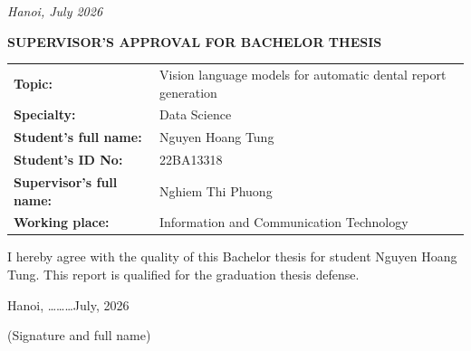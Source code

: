\documentclass[a4paper,12pt]{report}
\begin{document}
\vfill

\begin{center}
    \textit{Hanoi, July 2026}
\end{center}
\newpage
\newpage
{}
\setcounter{page}{1}


\newpage
\thispagestyle{empty}

\begin{center}
    \textbf{\large SUPERVISOR'S APPROVAL FOR BACHELOR THESIS}
\end{center}

\vspace{1.8cm}

\noindent
\renewcommand{\arraystretch}{1.6}
\begin{tabularx}{\textwidth}{@{}>{\bfseries}p{5.2cm}X@{}}
Topic: & Vision language models for automatic dental report generation \\
Specialty: & Data Science \\
Student's full name: & Nguyen Hoang Tung \\
Student's ID No: & 22BA13318 \\
Supervisor's full name: & Nghiem Thi Phuong \\
Working place: & Information and Communication Technology \\
\end{tabularx}

\vspace{1cm}

\noindent
I hereby agree with the quality of this Bachelor thesis for student Nguyen Hoang Tung. This report is qualified for the graduation thesis defense.

\vspace{1cm}

\begin{flushright}
Hanoi, \ldots\ldots\ldots July, 2026
\end{flushright}

\noindent
\hfill
{}

\vspace{3cm}

\begin{flushright}
(Signature and full name)
\end{flushright}
\end{document}
